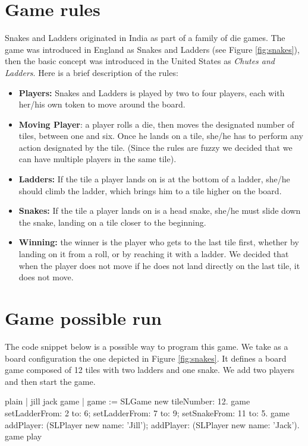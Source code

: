 \documentclass[10pt,twoside,english]{_support/latex/sbabook/sbabook}
\begin{document}
\section{Game rules}
Snakes and Ladders originated in India as part of a family of die games. The game was introduced in England as Snakes and Ladders (see Figure \ref{fig:snakes}), then the basic concept was introduced in the United States as \textit{Chutes and Ladders}.
Here is a brief description of the rules: 

\begin{itemize}
\item \textbf{Players:} Snakes and Ladders is played by two to four players, each with her/his own token to move around the board.
\item \textbf{Moving Player}: a player rolls a die, then moves the designated number of tiles, between one and six. Once he lands on a tile, she/he has to perform any action designated by the tile. (Since the rules are fuzzy we decided that we can have multiple players in the same tile).
\item \textbf{Ladders:} If the tile a player lands on is at the bottom of a ladder, she/he should climb the ladder, which brings him to a tile higher on the board.
\item \textbf{Snakes:} If the tile a player lands on is  a head snake, she/he must slide down the snake, landing on a tile closer to the beginning.
\item \textbf{Winning:} the winner is the player who gets to the last tile first, whether by landing on it from a roll, or by reaching it with a ladder. We  decided that when the player does not move if he does not land directly on the last tile, it does not move.
\end{itemize}
\section{Game possible run}
The code snippet below is a possible way to program this game. We take as a board configuration the one depicted in Figure \ref{fig:snakes}. It defines a board game composed of 12 tiles with two ladders and one snake. We  add two players and then start the game.

\begin{displaycode}{plain}
| jill jack game |
game := SLGame new tileNumber: 12.
game 
	setLadderFrom: 2 to: 6;
	setLadderFrom: 7 to: 9;
	setSnakeFrom: 11 to: 5.
game 
	addPlayer: (SLPlayer new name: 'Jill');
	addPlayer: (SLPlayer new name: 'Jack'). 
game play
\end{displaycode}
\end{document}
